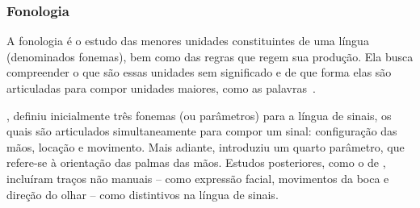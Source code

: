 \subsubsection{Fonologia}
\label{linguistica-gramatica-fonologia}

A fonologia é o estudo das menores unidades constituintes de uma língua (denominados fonemas), bem como das regras que regem sua produção. Ela busca compreender o que são essas unidades sem significado e de que forma elas são articuladas para compor unidades maiores, como as palavras~\cite{quadros-2004-estudos-linguisticos,hill-2019-sign-languages}. 






, definiu inicialmente três fonemas (ou parâmetros) para a língua de sinais, os quais são articulados simultaneamente para compor um sinal: configuração das mãos, locação e movimento. Mais adiante,  introduziu um quarto parâmetro, que refere-se à orientação das palmas das mãos. Estudos posteriores, como o de , incluíram traços não manuais -- como expressão facial, movimentos da boca e direção do olhar -- como distintivos na língua de sinais.

